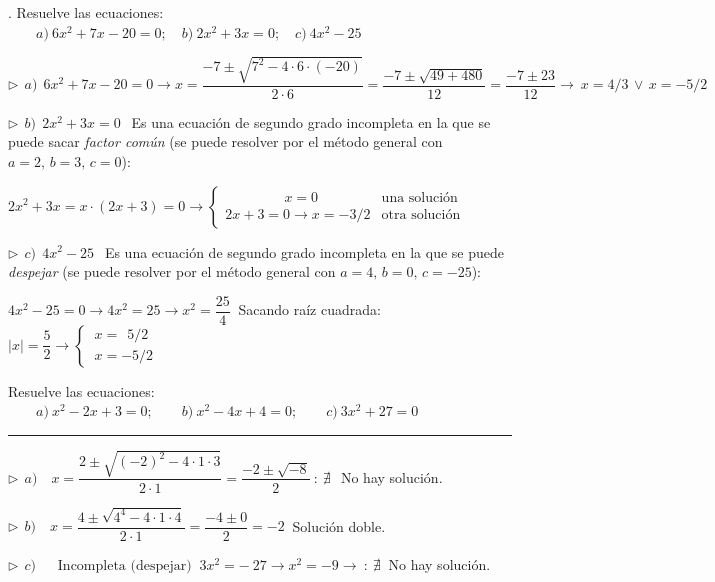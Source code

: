 \begin{miejemplo}
. Resuelve las ecuaciones: $\qquad  a)\ 6x^2+7x-20=0;\quad b)\ 2x^2+3x=0;\quad c)\ 4x^2-25$ 	

\vspace{5mm} $\triangleright \ \ a)\ \ 6x^2+7x-20=0 \to x=\dfrac{-7\pm \sqrt{7^2-4\cdot 6\cdot (-20)}}{2\cdot 6}=\dfrac{-7\pm \sqrt{49+480}}{12}=\dfrac{-7\pm 23}{12}\to \ x=4/3 \, \vee \, x=-5/2$

\vspace{5mm} $\triangleright \ \ b)\ \ 2x^2+3x=0 \ \ $ Es una ecuación de segundo grado incompleta en la que se puede sacar \emph{factor común} (se puede resolver por el método general con $a=2,\, b=3,\, c=0$):

$2x^2+3x=x\cdot(2x+3)=0 \to \begin{cases} \ \qquad \qquad x=0 & \text{una solución} \\ 2x+3=0 \to x=-3/2 & \text{otra solución} \end{cases}$


\vspace{5mm} $\triangleright \ \ c)\ \ 4x^2-25\ \ $  Es una ecuación de segundo grado incompleta en la que se puede \emph{despejar} (se puede resolver por el método general con $a=4,\, b=0,\, c=-25$):

$4x^2-25=0 \to 4x^2=25 \to x^2=\dfrac{25}{4} \ $ Sacando raíz cuadrada: $|x|=\dfrac 5 2 \to \begin{cases} \  x=\ \ 5/2  \\ \ x=-5/2\end{cases}$
\end{miejemplo}

\begin{miejercicio}

Resuelve las ecuaciones: $\qquad  a)\ x^2-2x+3=0;\qquad b)\ x^2-4x+4=0;\qquad c)\ 3x^2+27=0$

\rule{250pt}{0.1pt}

\vspace{2mm} $\triangleright \ \ a) \quad x=\dfrac{2\pm \sqrt{(-2)^2-4\cdot 1\cdot 3}}{2\cdot 1}=\dfrac{-2\pm \sqrt{-8}}{2} \ : \  \nexists \, \ $ No hay solución.

\vspace{5mm} $\triangleright \ \ b) \quad x=\dfrac{4\pm\sqrt{4^4-4\cdot 1 \cdot 4}}{2\cdot 1}=\dfrac{-4\pm 0}{2}=-2\ $ Solución doble.

\vspace{5mm} $\triangleright \ \ c)\ \quad  \text{ Incompleta (despejar) } \ 3x^2=-\ 27 \to x^2=-9 \to \ : \ \nexists \ $ No hay solución.	
\end{miejercicio}


